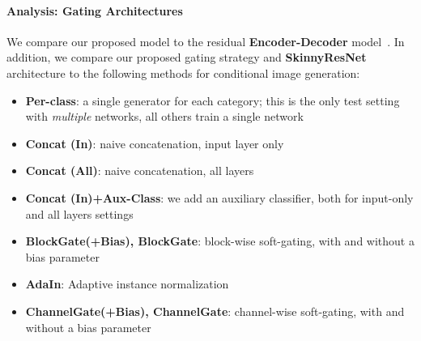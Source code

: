 \paragraph{Analysis: Gating Architectures}
We compare our proposed model to the residual \textbf{Encoder-Decoder} model~\cite{huang2018multimodal}.
In addition, we compare our proposed gating strategy and {\bf SkinnyResNet} architecture to the following methods for  conditional image generation:

\begin{itemize}[noitemsep,leftmargin=12pt]
\item{\bf Per-class}: a single generator for each category; this is the only test setting with \textit{multiple} networks, all others train a single network
\item{\bf Concat (In)}: naive concatenation, input layer only
\item{\bf Concat (All)}: naive concatenation, all layers
\item{\bf Concat (In)+Aux-Class}: we add an auxiliary classifier, both for input-only and all layers settings
\item{\bf BlockGate(+Bias), BlockGate}: block-wise soft-gating, with and without a bias parameter
\item{\bf AdaIn}: Adaptive instance normalization
\item{\bf ChannelGate(+Bias), ChannelGate}: channel-wise soft-gating, with and without a bias parameter
\end{itemize}
\vspace{-2mm}


